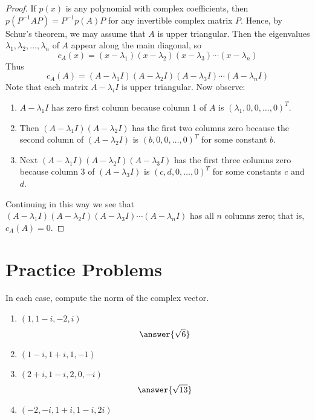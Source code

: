 \documentclass{ximera}
\begin{document}
\begin{proof}
If $p(x)$ is any polynomial with complex coefficients, then $p(P^{-1}AP) = P^{-1}p(A)P$ for any invertible complex matrix $P$. Hence, by Schur's theorem, we may assume that $A$ is upper triangular. Then the eigenvalues $\lambda_{1}, \lambda_{2}, \ldots, \lambda_{n}$ of $A$ appear along the main diagonal, so
\begin{equation*}
c_{A}(x) = (x - \lambda_{1})(x - \lambda_{2})(x - \lambda_{3}) \cdots (x -\lambda_{n})
\end{equation*}
Thus
\begin{equation*}
c_{A}(A) = (A - \lambda_{1}I)(A - \lambda_{2}I)(A - \lambda_{3}I) \cdots (A - \lambda_{n}I)
\end{equation*}
Note that each matrix $A - \lambda_{i}I$ is upper triangular. Now observe:
\begin{enumerate}
\item $A - \lambda_{1}I$ has zero first column because column 1 of $A$ is $(\lambda_{1}, 0, 0, \ldots, 0)^{T}$.
\item Then $(A - \lambda_{1}I)(A - \lambda_{2}I)$ has the first two columns zero because the second column of $(A - \lambda_{2}I)$ is $(b, 0, 0, \ldots, 0)^{T}$ for some constant $b$.
\item Next $(A - \lambda_{1}I)(A - \lambda_{2}I)(A - \lambda_{3}I)$ has the first three columns zero because column 3 of $(A -\lambda_{3}I)$ is $(c, d, 0, \ldots, 0)^{T}$ for some constants $c$ and $d$.
\end{enumerate}
Continuing in this way we see that $(A - \lambda_{1}I)(A - \lambda_{2}I)(A - \lambda_{3}I) \cdots (A - \lambda_{n}I)$ has all $n$ columns zero; that is, $c_{A}(A) = 0$.
\end{proof}

\section*{Practice Problems}


\begin{problem}\label{prb:complex_matrices1}
In each case, compute the norm of the complex vector.


\begin{enumerate}
\item $(1, 1 - i, -2, i)$
$$\answer{\sqrt{6}}$$
\item $(1 - i, 1 + i, 1, -1)$

\item $(2 + i, 1 - i, 2, 0, -i)$
$$\answer{\sqrt{13}}$$
\item $(-2, -i, 1 + i, 1 - i, 2i)$

\end{enumerate}
\end{problem}
\end{document}
